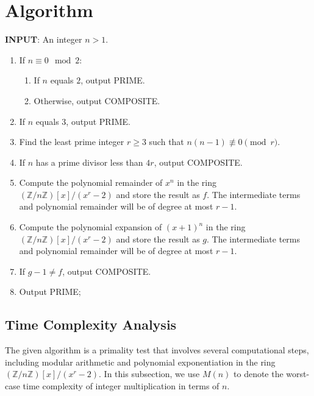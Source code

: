 \documentclass{article}
\theoremstyle{plain}
\theoremstyle{definition}
\newcommand{\Z}{\mathbb{Z}}
\begin{document}
\section{Algorithm} \label{section:algorithm}
\textbf{INPUT}: An integer $n > 1$.
\begin{center}
    \begin{enumerate}
        \item If $n \equiv 0 \mod{2}$:
            \begin{enumerate}
                \item If $n$ equals $2$, output PRIME.
                \item Otherwise, output COMPOSITE.
            \end{enumerate}
        \item If $n$ equals $3$, output PRIME.
        \item Find the least prime integer $r \geq 3$ such that $n (n-1) \not\equiv 0 \pmod{r}$.
        \item If $n$ has a prime divisor less than $4r$, output COMPOSITE.
        \item Compute the polynomial remainder of $x^n$ in the ring $(\Z/n\Z)[x]/(x^r-2)$ and store the result as $f$. The intermediate terms and polynomial remainder will be of degree at most $r-1$.
        \item Compute the polynomial expansion of $(x+1)^n$ in the ring $(\Z/n\Z)[x]/(x^r-2)$ and store the result as $g$. The intermediate terms and polynomial remainder will be of degree at most $r-1$.
        \item If $g-1 \not= f$, output COMPOSITE.
        \item Output PRIME;
    \end{enumerate}
\end{center}

\subsection{Time Complexity Analysis} \label{subsection:timecomplexity}
The given algorithm is a primality test that involves several computational steps, including modular arithmetic and polynomial exponentiation in the ring $(\Z/n\Z)[x]/(x^r-2)$. In this subsection, we use $M(n)$ to denote the worst-case time complexity of integer multiplication in terms of $n$.
\end{document}
